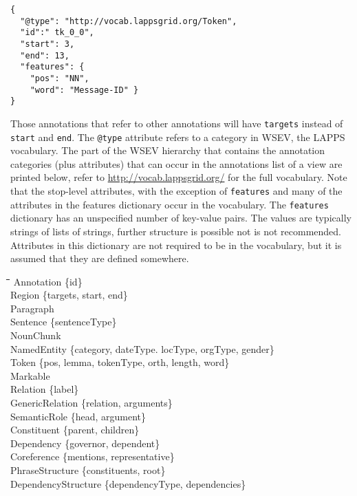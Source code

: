 \documentclass[11pt]{article}
\newcommand{\tag}[1]{{\tt #1}}
\newcommand{\attr}[1]{{\tt #1}}
\newcommand{\attrs}[1]{\{#1\}}
\newcommand{\tab}{\hspace*{1cm}}
\newenvironment{example}
    {\begin{tcolorbox}\small}
    {\end{tcolorbox}}
\begin{document}
\begin{example}
\begin{verbatim}
{  
  "@type": "http://vocab.lappsgrid.org/Token",
  "id":" tk_0_0",
  "start": 3,
  "end": 13,
  "features": {  
    "pos": "NN",
    "word": "Message-ID" }
}
\end{verbatim}
\end{example}

Those annotations that refer to other annotations will have \tag{targets} instead of \tag{start} and \tag{end}. The \tag{@type} attribute refers to a category in WSEV, the LAPPS vocabulary. The part of the WSEV hierarchy that contains the annotation categories (plus attributes) that can occur in the annotations list of a view are printed below, refer to {\color{blue}\href{http://vocab.lappsgrid.org/}{http://vocab.lappsgrid.org/}} for the full vocabulary. Note that the stop-level attributes, with the exception of \attr{features} and many of the attributes in the features dictionary occur in the vocabulary. The \tag{features} dictionary has an unspecified number of key-value pairs. The values are typically strings of lists of strings, further structure is possible not is not recommended. Attributes in this dictionary are not required to be in the vocabulary, but it is assumed that they are defined somewhere.

\begin{example}
\begin{tabbing}
\tab\=\tab\=\tab\=\tab\=\tab\= \kill
Annotation \attrs{id} \\
\> Region \attrs{targets, start, end} \\
\> \> Paragraph \\
\> \> Sentence \attrs{sentenceType} \\
\> \> NounChunk \\
\> \> NamedEntity \attrs{category, dateType. locType, orgType, gender} \\
\> \> Token \attrs{pos, lemma, tokenType, orth, length, word} \\
\> \> Markable \\
\> Relation \attrs{label} \\
\> \> GenericRelation \attrs{relation, arguments} \\
\> \> SemanticRole \attrs{head, argument} \\
\> \> Constituent \attrs{parent, children} \\
\> \> Dependency \attrs{governor, dependent} \\
\> Coreference \attrs{mentions, representative} \\
\> PhraseStructure \attrs{constituents, root} \\
\> DependencyStructure \attrs{dependencyType, dependencies}
\end{tabbing}
\end{example}
\end{document}
